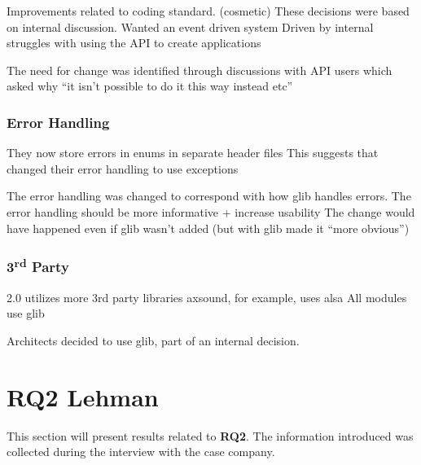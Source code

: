 \documentclass[conference]{IEEEtran}
\begin{document}
Improvements related to coding standard. (cosmetic)
These decisions were based on internal discussion.
Wanted an event driven system
Driven by internal struggles with using the API to create applications

The need for change was identified through discussions with API users which asked why “it isn’t possible to do it this way instead etc”





\subsubsection{Error Handling}

They now store errors in enums in separate header files
This suggests that changed their error handling to use exceptions




The error handling was changed to correspond with how glib handles errors. 
The error handling should be more informative + increase usability
The change would have happened even if glib wasn’t added (but with glib made it “more obvious”)





\subsubsection{3\textsuperscript{rd} Party}

2.0 utilizes more 3rd party libraries
axsound, for example, uses alsa
All modules use glib





Architects decided to use glib, part of an internal decision. 



\section{RQ2 Lehman}
This section will present results related to \textbf{RQ2}. The information introduced was collected during the interview with the case company. 
\end{document}

